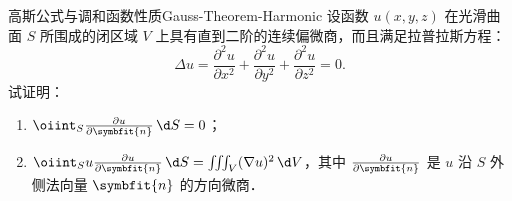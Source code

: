 \begin{problem}{高斯公式与调和函数性质}{Gauss-Theorem-Harmonic}
    设函数 $u(x,y,z)$ 在光滑曲面 $S$ 所围成的闭区域 $V$ 上具有直到二阶的连续偏微商，而且满足拉普拉斯方程：
    \begin{equation}
        \Delta u = \frac{\partial^2 u}{\partial x^2} + \frac{\partial^2 u}{\partial y^2} + \frac{\partial^2 u}{\partial z^2} = 0.
    \end{equation}
    试证明：
    \begin{enumerate}
        \item $\oiint_S \frac{\partial u}{\partial \symbfit{n}} \, \d S = 0$；
        \item $\oiint_S u \frac{\partial u}{\partial \symbfit{n}} \, \d S = \iiint_V (\nabla u)^2 \, \d V$，其中 $\frac{\partial u}{\partial \symbfit{n}}$ 是 $u$ 沿 $S$ 外侧法向量 $\symbfit{n}$ 的方向微商．
    \end{enumerate}
\end{problem}

